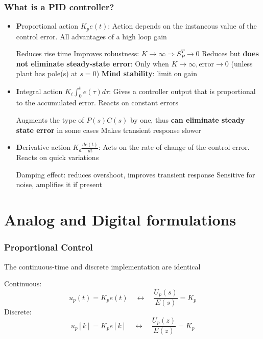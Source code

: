 \begin{frame}
	\frametitle{What is a PID controller?}
	\small{
	\begin{itemize}
		\item \textbf{P}roportional action $K_p e(t)$: Action depends on the instaneous value of the control error. All advantages of a high loop gain
			\begin{itemize}
				\pro Reduces rise time
				\pro Improves robustness: $K \rightarrow \infty \Rightarrow S^T_P \rightarrow 0$
				\con Reduces but \textbf{does not eliminate steady-state error}: Only when $K \rightarrow \infty , \text{error} \rightarrow 0$
				 (unless plant has pole(s) at $s=0$)
				\con \textbf{Mind stability}: limit on gain
			\end{itemize}
		\item \textbf{I}ntegral action $K_i\int_0^t e(\tau)d\tau$: Gives a controller output that is proportional to the accumulated error. Reacts on constant errors
			\begin{itemize}
				\pro Augments the type of $P(s)C(s)$ by one, thus \textbf{can eliminate steady state error} in some cases
				\con Makes transient response slower 
			\end{itemize}
	
	\end{itemize}}
\end{frame}
\begin{frame}
	\begin{itemize}
			\item \textbf{D}erivative action $K_d \frac{de(t)}{dt}$: Acts on the rate of change of the control error. Reacts on quick variations
			\begin{itemize}
				\pro Damping effect: reduces overshoot, improves transient response
				\con Sensitive for noise, amplifies it if present
			\end{itemize}
	\end{itemize}
\end{frame}
\section{Analog and Digital formulations}

\begin{frame}
	\frametitle{Proportional Control}
	The continuous-time and discrete implementation are identical
	
	Continuous:
	\begin{equation*}
		u_p(t) = K_p e(t) \quad \leftrightarrow \quad \frac{U_p(s)}{E(s)} = K_p 
	\end{equation*}
	Discrete:
	\begin{equation*}
		u_p[k] = K_p e[k] \quad \leftrightarrow \quad \frac{U_p(z)}{E(z)} = K_p 
	\end{equation*}
\end{frame}

